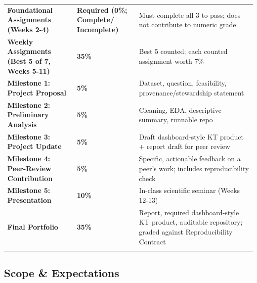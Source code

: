 \documentclass[
  letterpaper,
  DIV=11,
  numbers=noendperiod,
  oneside]{scrreprt}
\begin{document}
\begin{table}[!h]
\centering
\begin{tabular}{>{\raggedright\arraybackslash}p{6cm}>{\raggedright\arraybackslash}p{3cm}>{\raggedright\arraybackslash}p{6cm}}
\toprule
\cellcolor{brandblue}{\textcolor{white}{\textbf{Component}}} & \cellcolor{brandblue}{\textcolor{white}{\textbf{Weight}}} & \cellcolor{brandblue}{\textcolor{white}{\textbf{Notes}}}\\
\midrule
\textbf{Foundational Assignments (Weeks 2-4)} & \textcolor{brandlight}{\textbf{Required (0\%; Complete/ Incomplete)}} & Must complete all 3 to pass; does not contribute to numeric grade\\
\addlinespace
\textbf{Weekly Assignments (Best 5 of 7, Weeks 5-11)} & \textcolor{brandlight}{\textbf{35\%}} & Best 5 counted; each counted assignment worth 7\%\\
\addlinespace
\textbf{Milestone 1: Project Proposal} & \textcolor{brandlight}{\textbf{5\%}} & Dataset, question, feasibility, provenance/stewardship statement\\
\addlinespace
\textbf{Milestone 2: Preliminary Analysis} & \textcolor{brandlight}{\textbf{5\%}} & Cleaning, EDA, descriptive summary, runnable repo\\
\addlinespace
\textbf{Milestone 3: Project Update} & \textcolor{brandlight}{\textbf{5\%}} & Draft dashboard-style KT product + report draft for peer review\\
\addlinespace
\textbf{Milestone 4: Peer-Review Contribution} & \textcolor{brandlight}{\textbf{5\%}} & Specific, actionable feedback on a peer's work; includes reproducibility check\\
\addlinespace
\textbf{Milestone 5: Presentation} & \textcolor{brandlight}{\textbf{10\%}} & In-class scientific seminar (Weeks 12-13)\\
\addlinespace
\textbf{Final Portfolio} & \textcolor{brandlight}{\textbf{35\%}} & Report, required dashboard-style KT product, auditable repository; graded against Reproducibility Contract\\
\addlinespace
\cellcolor{gray!20}{\textbf{\textbf{Total}}} & \cellcolor{gray!20}{\textbf{\textcolor{brandlight}{\textbf{100\%}}}} & \cellcolor{gray!20}{\textbf{}}\\
\bottomrule
\end{tabular}
\end{table}

\subsection{Scope \& Expectations}\label{scope-expectations}
\end{document}
